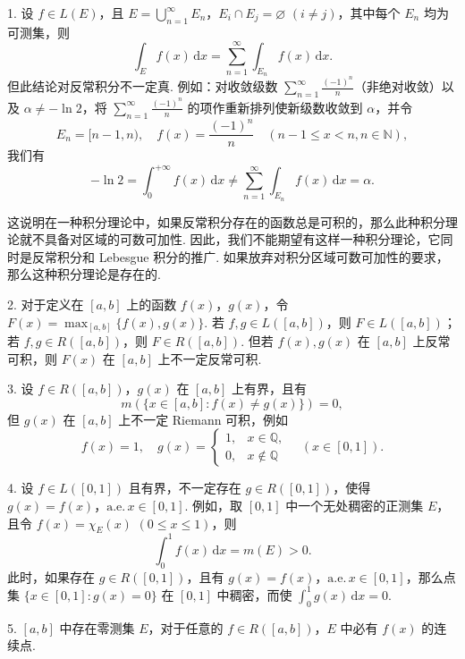 \documentclass[../../main.tex]{subfiles}%
\begin{document}
\begin{remark}
1. 设 \( f \in L(E) \)，且 \( E = \bigcup_{n = 1}^{\infty} E_n \)，\( E_i \cap E_j = \varnothing \) \( (i \neq j) \)，其中每个 \( E_n \) 均为可测集，则
\[
\int_E f(x) \, \mathrm{d}x = \sum_{n = 1}^{\infty} \int_{E_n} f(x) \, \mathrm{d}x.
\]
但此结论对反常积分不一定真. 例如：对收敛级数 \( \sum_{n = 1}^{\infty} \frac{(-1)^n}{n} \)（非绝对收敛）以及 \( \alpha \neq -\ln 2 \)，将 \( \sum_{n = 1}^{\infty} \frac{(-1)^n}{n} \) 的项作重新排列使新级数收敛到 \( \alpha \)，并令
\[
E_n = [n - 1, n), \quad f(x) = \frac{(-1)^n}{n} \quad (n - 1 \leqslant  x < n, n \in \mathbb{N}),
\]
我们有
\[
-\ln 2 = \int_0^{+\infty} f(x) \, \mathrm{d}x \neq \sum_{n = 1}^{\infty} \int_{E_n} f(x) \, \mathrm{d}x = \alpha.
\]

这说明在一种积分理论中，如果反常积分存在的函数总是可积的，那么此种积分理论就不具备对区域的可数可加性. 因此，我们不能期望有这样一种积分理论，它同时是反常积分和 Lebesgue 积分的推广. 如果放弃对积分区域可数可加性的要求，那么这种积分理论是存在的.

2. 对于定义在 \( [a, b] \) 上的函数 \( f(x) \)，\( g(x) \)，令 \( F(x) = \max_{[a, b]} \{ f(x), g(x) \} \). 若 \( f, g \in L([a, b]) \)，则 \( F \in L([a, b]) \)；若 \( f, g \in R([a, b]) \)，则 \( F \in R([a, b]) \). 但若 \( f(x), g(x) \) 在 \( [a, b] \) 上反常可积，则 \( F(x) \) 在 \( [a, b] \) 上不一定反常可积.

3. 设 \( f \in R([a, b]) \)，\( g(x) \) 在 \( [a, b] \) 上有界，且有
\[
m(\{ x \in [a, b] : f(x) \neq g(x) \}) = 0,
\]
但 \( g(x) \) 在 \( [a, b] \) 上不一定 Riemann 可积，例如
\[
f(x) = 1, \quad g(x) = 
\begin{cases} 
1, & x \in \mathbb{Q}, \\
0, & x \notin \mathbb{Q}
\end{cases} \quad (x \in [0, 1]).
\]

4. 设 \( f \in L([0, 1]) \) 且有界，不一定存在 \( g \in R([0, 1]) \)，使得 \( g(x) = f(x) \)，\(\text{a.e.}\, x \in [0, 1] \). 例如，取 \( [0, 1] \) 中一个无处稠密的正测集 \( E \)，且令 \( f(x) = \chi_E(x) \) \( (0 \leqslant  x \leqslant  1) \)，则
\[
\int_0^1 f(x) \, \mathrm{d}x = m(E) > 0.
\]
此时，如果存在 \( g \in R([0, 1]) \)，且有 \( g(x) = f(x) \)，\(\text{a.e.}\, x \in [0, 1] \)，那么点集 \( \{ x \in [0, 1] : g(x) = 0 \} \) 在 \( [0, 1] \) 中稠密，而使 \( \int_0^1 g(x) \, \mathrm{d}x = 0 \).

5. \( [a, b] \) 中存在零测集 \( E \)，对于任意的 \( f \in R([a, b]) \)，\( E \) 中必有 \( f(x) \) 的连续点.


\end{remark}
\end{document}
